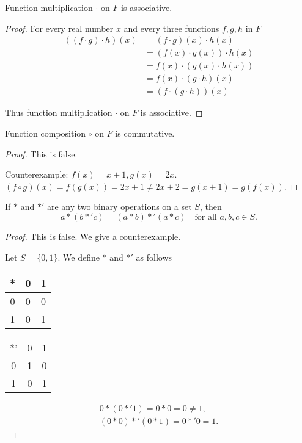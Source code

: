 \begin{exercise}
    Function multiplication $\cdot$ on $F$ is associative.
\end{exercise}

\begin{proof}
    For every real number $x$ and every three functions $f, g, h$ in $F$
    \begin{align*}
        ((f \cdot g) \cdot h)(x) & = (f \cdot g)(x) \cdot h(x)    \\
                                 & = (f(x) \cdot g(x)) \cdot h(x) \\
                                 & = f(x) \cdot (g(x) \cdot h(x)) \\
                                 & = f(x) \cdot (g \cdot h)(x)    \\
                                 & = (f \cdot (g \cdot h))(x)
    \end{align*}

    Thus function multiplication $\cdot$ on $F$ is associative.
\end{proof}

\begin{exercise}
    Function composition $\circ$ on $F$ is commutative.
\end{exercise}

\begin{proof}
    This is false.

    Counterexample: $f(x) = x + 1, g(x) = 2x$. $(f\circ g)(x) = f(g(x)) = 2x + 1\ne 2x + 2 = g(x + 1) = g(f(x))$.
\end{proof}

\begin{exercise}
    If $*$ and $*'$ are any two binary operations on a set $S$, then
    \[
        a * (b *' c) = (a * b) *' (a * c)\quad\text{for all $a, b, c\in S$.}
    \]
\end{exercise}

\begin{proof}
    This is false. We give a counterexample.

    Let $S = \{ 0, 1 \}$. We define $*$ and $*'$ as follows
    \begin{tabular}{c|cc}
        * & 0 & 1 \\
        \midrule
        0 & 0 & 0 \\
        1 & 0 & 1
    \end{tabular}
    \begin{tabular}{c|cc}
        \midrule
        *' & 0 & 1 \\
        0  & 1 & 0 \\
        1  & 0 & 1
    \end{tabular}
    \[
        \begin{split}
            0 * (0 *' 1) = 0 * 0 = 0 \ne 1,  \\
            (0 * 0) *' (0 * 1) = 0 *' 0 = 1.
        \end{split}
    \]
\end{proof}

